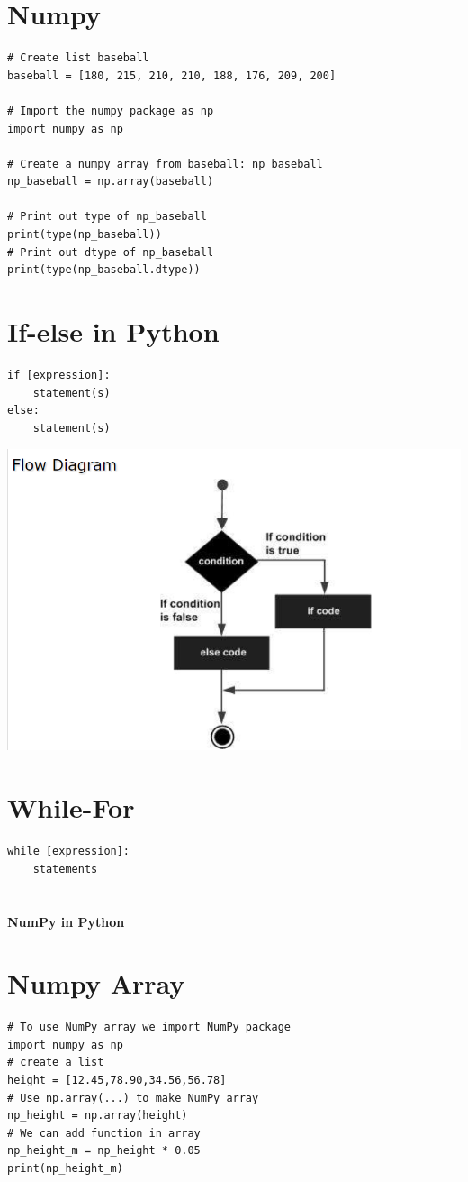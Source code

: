 \documentclass[12pt]{article}
\begin{document}
\section{Numpy}
\begin{lstlisting}
# Create list baseball
baseball = [180, 215, 210, 210, 188, 176, 209, 200]

# Import the numpy package as np
import numpy as np

# Create a numpy array from baseball: np_baseball
np_baseball = np.array(baseball)

# Print out type of np_baseball
print(type(np_baseball))
# Print out dtype of np_baseball
print(type(np_baseball.dtype))
\end{lstlisting}
\bigbreak
\section{If-else in Python}
\begin{lstlisting}
if [expression]:
	statement(s)
else:
	statement(s)
\end{lstlisting}
\bigbreak
\includegraphics{hinh1}
\section{While-For}
\begin{lstlisting}
while [expression]:
	statements
\end{lstlisting}
\section{}
\pagebreak
\begin{center}
\textbf{NumPy in Python}
\end{center}
\section{Numpy Array}
\begin{lstlisting}
# To use NumPy array we import NumPy package
import numpy as np
# create a list
height = [12.45,78.90,34.56,56.78]
# Use np.array(...) to make NumPy array
np_height = np.array(height)
# We can add function in array
np_height_m = np_height * 0.05
print(np_height_m)
\end{lstlisting}
\end{document}
